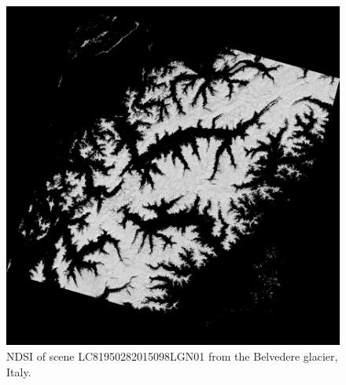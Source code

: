\documentclass[11pt, a4paper]{report}
\begin{document}
	\begin{figure}[h]
		\centering
		\includegraphics[scale=0.3]{../images/LC81950282015098LGN01_ndsi.png}
		\caption{NDSI of scene LC81950282015098LGN01 from the Belvedere glacier, Italy.}
		\label{fig:belvedere_ndsi}
	\end{figure}
\end{document}
